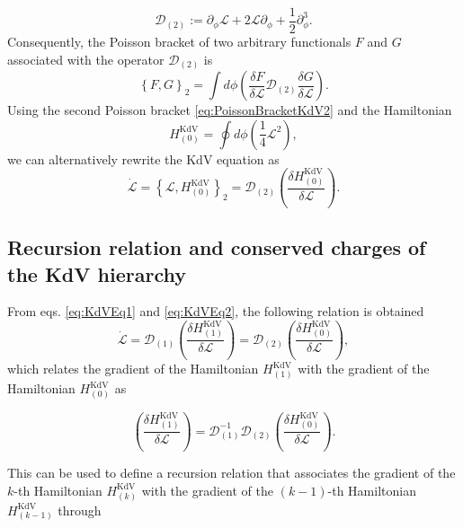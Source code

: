 \documentclass[letterpaper,11pt,oneside]{book}
\begin{document}
\begin{equation}
	\mathcal{D}_{\left(2\right)}:=\partial_{\phi}\mathcal{L}+2\mathcal{L}\partial_{\phi}+\frac{1}{2}\partial_{\phi}^{3}.\label{eq:D2KdV}
\end{equation}
Consequently, the Poisson bracket of two arbitrary functionals $F$
and $G$ associated with the operator $\mathcal{D}_{\left(2\right)}$
is
\begin{equation}
	\left\{ F,G\right\} _{2}=\int d\phi\left(\frac{\delta F}{\delta\mathcal{L}}\mathcal{D}_{\left(2\right)}\frac{\delta G}{\delta\mathcal{L}}\right).\label{eq:PoissonBracketKdV2}
\end{equation}
Using the second Poisson bracket \eqref{eq:PoissonBracketKdV2} and the Hamiltonian
\begin{equation}
	H_{\left(0\right)}^{\text{KdV}}=\oint d\phi\left(\frac{1}{4}\mathcal{L}^{2}\right),\label{eq:HKdV0}
\end{equation}
we can alternatively rewrite the KdV equation as
\begin{equation}
	\dot{\mathcal{L}}=\left\{ \mathcal{L},H_{\left(0\right)}^{\text{KdV}}\right\} _{2}=\mathcal{D}_{\left(2\right)}\left(\frac{\delta H_{\left(0\right)}^{\text{KdV}}}{\delta\mathcal{L}}\right).\label{eq:KdVEq2}
\end{equation}


\subsection{Recursion relation and conserved charges of the KdV hierarchy}

From eqs. \eqref{eq:KdVEq1} and \eqref{eq:KdVEq2}, the following relation is obtained
\[
\dot{\mathcal{L}}=\mathcal{D}_{\left(1\right)}\left(\frac{\delta H_{\left(1\right)}^{\text{KdV}}}{\delta\mathcal{L}}\right)=\mathcal{D}_{\left(2\right)}\left(\frac{\delta H_{\left(0\right)}^{\text{KdV}}}{\delta\mathcal{L}}\right),
\]
which relates the gradient of the Hamiltonian $H_{\left(1\right)}^{\text{KdV}}$
with the gradient of the Hamiltonian $H_{\left(0\right)}^{\text{KdV}}$
as 

\begin{equation}
	\left(\frac{\delta H_{\left(1\right)}^{\text{KdV}}}{\delta\mathcal{L}}\right)=\mathcal{D}_{\left(1\right)}^{-1}\mathcal{D}_{\left(2\right)}\left(\frac{\delta H_{\left(0\right)}^{\text{KdV}}}{\delta\mathcal{L}}\right).\label{eq:Recursion Relation KdV 0 and 1}
\end{equation}

This can be used to define a recursion relation that associates the gradient of the $k$-th Hamiltonian $H_{\left(k\right)}^{\text{KdV}}$ with the gradient of the $\left(k-1\right)$-th Hamiltonian $H_{\left(k-1\right)}^{\text{KdV}}$ through
\end{document}
